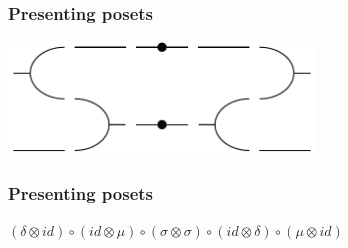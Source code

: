 \documentclass[t, pdftex]{beamer}
\begin{document}
\begin{frame}
    \frametitle{Presenting posets}
    \vspace*{\fill}
    \begin{center}
        \includegraphics[height=3cm]{figures/dia4.pdf}
    \end{center}
    \vspace*{\fill}
\end{frame}

\begin{frame}
    \frametitle{Presenting posets}
    \vspace*{\fill}
    \begin{center}
        $(\delta \otimes id) \circ (id \otimes \mu) \circ (\sigma \otimes \sigma) \circ (id \otimes \delta) \circ (\mu \otimes id)$
    \end{center}
    \vspace*{\fill}
\end{frame}
\end{document}
